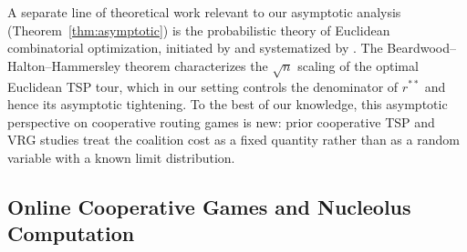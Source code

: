 \documentclass[11pt]{article}
\theoremstyle{plain}
\theoremstyle{definition}
\theoremstyle{remark}
\begin{document}
A separate line of theoretical work relevant to our asymptotic analysis (Theorem~\ref{thm:asymptotic}) is the probabilistic theory of Euclidean combinatorial optimization, initiated by \citet{beardwood1959shortest} and systematized by \citet{steele1981subadditive,steele1997probability}. The Beardwood--Halton--Hammersley theorem characterizes the $\sqrt{n}$ scaling of the optimal Euclidean TSP tour, which in our setting controls the denominator of $r^{\ast\ast}$ and hence its asymptotic tightening. To the best of our knowledge, this asymptotic perspective on cooperative routing games is new: prior cooperative TSP and VRG studies \citep{potters1992tsg,gothe1996vrg,engevall2004heterogeneous,kimms2016core} treat the coalition cost as a fixed quantity rather than as a random variable with a known limit distribution.

\subsection{Online Cooperative Games and Nucleolus Computation}
\end{document}
